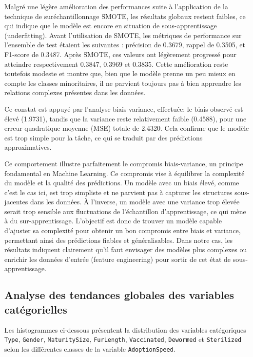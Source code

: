 \documentclass[a4paper,12pt]{article}
\begin{document}
 
Malgré une légère amélioration des performances suite à l'application de la technique de suréchantillonnage SMOTE, les résultats globaux restent faibles, ce qui indique que le modèle est encore en situation de sous-apprentissage (underfitting). Avant l’utilisation de SMOTE, les métriques de performance sur l’ensemble de test étaient les suivantes : précision de 0.3679, rappel de 0.3505, et F1-score de 0.3487. Après SMOTE, ces valeurs ont légèrement progressé pour atteindre respectivement 0.3847, 0.3969 et 0.3835. Cette amélioration reste toutefois modeste et montre que, bien que le modèle prenne un peu mieux en compte les classes minoritaires, il ne parvient toujours pas à bien apprendre les relations complexes présentes dans les données.
 
Ce constat est appuyé par l’analyse biais-variance, effectuée: le biais observé est élevé (1.9731), tandis que la variance reste relativement faible (0.4588), pour une erreur quadratique moyenne (MSE) totale de 2.4320. Cela confirme que le modèle est trop simple pour la tâche, ce qui se traduit par des prédictions approximatives.
 
Ce comportement illustre parfaitement le compromis biais-variance, un principe fondamental en Machine Learning. Ce compromis vise à équilibrer la complexité du modèle et la qualité des prédictions. Un modèle avec un biais élevé, comme c’est le cas ici, est trop simpliste et ne parvient pas à capturer les structures sous-jacentes dans les données. À l’inverse, un modèle avec une variance trop élevée serait trop sensible aux fluctuations de l’échantillon d’apprentissage, ce qui mène à du sur-apprentissage. L’objectif est donc de trouver un modèle capable d’ajuster sa complexité pour obtenir un bon compromis entre biais et variance, permettant ainsi des prédictions fiables et généralisables. Dans notre cas, les résultats indiquent clairement qu’il faut envisager des modèles plus complexes ou enrichir les données d’entrée (feature engineering) pour sortir de cet état de sous-apprentissage.
 

\subsection{Analyse des tendances globales des variables catégorielles}

Les histogrammes ci-dessous présentent la distribution des variables catégoriques \texttt{Type}, \texttt{Gender}, \texttt{MaturitySize}, \texttt{FurLength}, \texttt{Vaccinated}, \texttt{Dewormed} et \texttt{Sterilized} selon les différentes classes de la variable \texttt{AdoptionSpeed}.
 
\end{document}
